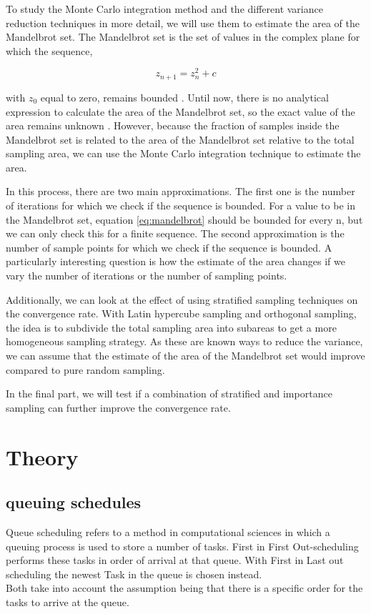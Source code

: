 \documentclass{uva-inf-article}
\begin{document}
To study the Monte Carlo integration method and the different variance reduction techniques in more detail, we will use them to estimate the area of the Mandelbrot set. The Mandelbrot set is the set of values in the complex plane for which the sequence,

\begin{equation}
    z_{n + 1} = z_n^2 + c
    \label{eq:mandelbrot}
\end{equation}

with $z_0$ equal to zero, remains bounded \parencite{ewing1992}.
Until now, there is no analytical expression to calculate the area of the Mandelbrot set, so the exact value of the area remains unknown \parencite{bittner2017}.
However, because the fraction of samples inside the Mandelbrot set is related to the area of the Mandelbrot set relative to the total sampling area, we can use the Monte Carlo integration technique to estimate the area.

In this process, there are two main approximations. The first one is the number of iterations for which we check if the sequence is bounded. For a value to be in the Mandelbrot set, equation \ref{eq:mandelbrot} should be bounded for every n, but we can only check this for a finite sequence. The second approximation is the number of sample points for which we check if the sequence is bounded. A particularly interesting question is how the estimate of the area changes if we vary the number of iterations or the number of sampling points.

Additionally, we can look at the effect of using stratified sampling techniques on the convergence rate. With Latin hypercube sampling \parencite{wei1996} and orthogonal sampling, the idea is to subdivide the total sampling area into subareas to get a more homogeneous sampling strategy. As these are known ways to reduce the variance, we can assume that the estimate of the area of the Mandelbrot set would improve compared to pure random sampling.

In the final part, we will test if a combination of stratified and importance sampling can further improve the convergence rate.

\section{Theory}
    
    \subsection{queuing schedules}
    Queue scheduling refers to a method in computational sciences in which a queuing 
    process is used to store a number of tasks. First in First Out-scheduling performs these tasks in order of arrival at that queue. With First in Last out scheduling the newest Task in the queue is chosen instead.\\
    Both take into account the assumption being that there is a specific order for the tasks to arrive at
    the queue.\\
    
\end{document}
